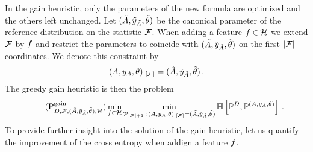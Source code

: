 In the gain heuristic, only the parameters of the new formula are optimized and the others left unchanged.
Let $(\tilde{A},\tilde{y}_{\tilde{A}},\tilde{\theta})$ be the canonical parameter of the reference distribution on the statistic $\mathcal{F}$.
When adding a feature $f\in\mathcal{H}$ we extend $\mathcal{F}$ by $f$ and restrict the parameters to coincide with $(\tilde{A},\tilde{y}_{\tilde{A}},\tilde{\theta})$ on the first $\left|\mathcal{F}\right|$ coordinates.
We denote this constraint by
\begin{align*}
    {(A,y_{A},\theta)}|_{[\mathcal{F}]} = (\tilde{A},\tilde{y}_{\tilde{A}},\tilde{\theta}) \, .
\end{align*}
The greedy gain heuristic is then the problem
\begin{align}
    \label{prob:greedyGain}\tag{$\probtagtypeinst{\gainsymbol}{\datamap,\formulaset,\sechybridparam,\greedyhypothesis}$}
    \min_{\formula\in\greedyhypothesis} \min_{\hybridparamsetofdim{\cardof{\mlnstat}+1} \wcols \restrictionofto{\hybridparam}{[\mlnstat]} = \sechybridparam }
    \centropyof{\empdistribution}{\probof{\hybridparam}} \, .
\end{align}
To provide further insight into the solution of the gain heuristic, let us quantify the improvement of the cross entropy when addign a feature $f$.

